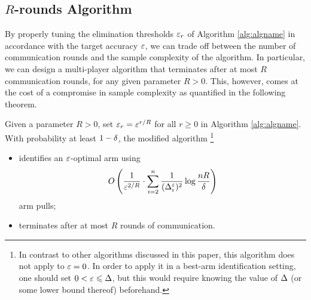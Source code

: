 %




\subsection{$R$-rounds Algorithm}


By properly tuning the elimination thresholds $\varepsilon_r$ of Algorithm
\ref{alg:algname} in accordance with the target accuracy $\varepsilon$, we can trade
off between the number of communication rounds and the sample complexity of the
algorithm.   
In particular, we can design a multi-player algorithm that terminates after at
most $R$ communication rounds, for any given parameter $R>0$.
This, however, comes at the cost of a compromise in sample complexity as quantified in the following theorem.


\begin{theorem} \label{thm:main3}
Given a parameter $R > 0$, set $\varepsilon_r = \varepsilon^{r/R}$ for all $r \ge 0$ in Algorithm \ref{alg:algname}.
With probability at least $1-\delta$, the modified algorithm%
\footnote{In contrast to other algorithms discussed in this paper, this
algorithm does not apply to $\varepsilon=0$. In order to apply it in a best-arm
identification setting, one should set $0<\varepsilon\leqslant\Delta$, but this would require
knowing the value of $\Delta$ (or some lower bound thereof) beforehand. }  
\begin{itemize}
\item
identifies an $\varepsilon$-optimal arm using
\begin{align*}
	O\left(
		\frac{1}{\varepsilon^{2/R}}
		\cdot
		\sum_{i=2}^{n} \frac{1}{(\Delta^{\varepsilon}_i)^2}
		\log \frac{n R}{\delta}
	\right)
\end{align*}
arm pulls;
\item
terminates after at most $R$ rounds of communication.
\end{itemize}
\end{theorem}



